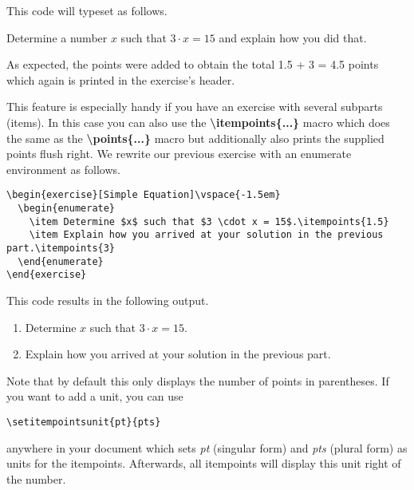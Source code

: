 \documentclass[
  twocolumn,%
  fontsize=9pt,%
  DIV=calc,%
  numbers=noendperiod%
]{scrartcl}
\begin{document}
\noindent This code will typeset as follows.

\begin{exercise}
  Determine a number $x$ such that $3 \cdot x = 15$ and explain how you did that.
\end{exercise}

\noindent As expected, the points were added to obtain the total 1.5 + 3 = 4.5 points which again is printed in the exercise's header. 

This feature is especially handy if you have an exercise with several subparts (items). In this case you can also use the \textcolor{NavyBlue}{\ttfamily\bfseries \textbackslash itempoints\{...\}} macro which does the same as the \textcolor{NavyBlue}{\ttfamily\bfseries \textbackslash points\{...\}} macro but additionally also prints the supplied points flush right. We rewrite our previous exercise with an enumerate environment as follows.

\begin{lstlisting}
\begin{exercise}[Simple Equation]\vspace{-1.5em}
  \begin{enumerate}
    \item Determine $x$ such that $3 \cdot x = 15$.\itempoints{1.5}
    \item Explain how you arrived at your solution in the previous part.\itempoints{3}
  \end{enumerate}
\end{exercise} 
\end{lstlisting}

\noindent This code results in the following output.
\begin{exercise}\vspace{-1.5em}
  \begin{enumerate}
    \item Determine $x$ such that $3 \cdot x = 15$.
    \item Explain how you arrived at your solution in the previous part.
  \end{enumerate}
\end{exercise}

Note that by default this only displays the number of points in parentheses. If you want to add a unit, you can use
\begin{lstlisting}
\setitempointsunit{pt}{pts}
\end{lstlisting}
anywhere in your document which sets \emph{pt} (singular form) and \emph{pts} (plural form) as units for the itempoints. Afterwards, all itempoints will display this unit right of the number.
\end{document}
